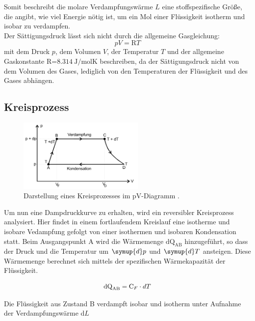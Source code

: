 Somit beschreibt die molare Verdampfungswärme $L$ eine stoffspezifische Größe, die angibt, wie viel Energie nötig ist,
um ein Mol einer Flüssigkeit isotherm und isobar zu verdampfen.\\
Der Sättigungsdruck lässt sich nicht durch die allgemeine Gasgleichung:
\begin{equation}
    pV=\text{R}T
    \label{eqn:Gasgl}
\end{equation}
mit dem Druck $p$, dem Volumen $V$, der Temperatur $T$ und der allgemeine Gaskonstante R=$\SI{8.314}{\joule\per\mole\kelvin}$ 
beschreiben, da der Sättigungsdruck nicht von dem Volumen des Gases, lediglich von den Temperaturen der Flüssigkeit 
und des Gases abhängen.
\\

\subsection{Kreisprozess}

\begin{figure}[H]
    \centering
    \includegraphics[width=0.55\textwidth]{images/Kreislauf.PNG}
    \caption{Darstellung eines Kreisprozesses im pV-Diagramm \protect \cite{V203}.}
    \label{img:Kreislauf}
\end{figure}

\noindent Um nun eine Dampdruckkurve zu erhalten, wird ein reversibler Kreisprozess analysiert. Hier findet in einem fortlaufendem 
Kreislauf eine isotherme und isobare Vedampfung gefolgt von einer isothermen und isobaren Kondensation statt.
Beim Ausgangspunkt A wird die Wärmemenge $\text{dQ}_\text{AB} $ hinzugeführt, so dass der Druck und die Temperatur um $\symup{d}p$ und $\symup{d}T$ ansteigen.
Diese Wärmemenge berechnet sich mittels der spezifischen Wärmekapazität der Flüssigkeit.

\begin{equation}
    \text{dQ}_\text{AB}= \text{C}_F \cdot dT \nonumber\\
\end{equation}
\newpage

\noindent Die Flüssigkeit aus Zustand B verdampft isobar und isotherm unter Aufnahme der Verdampfungswärme d$L$\\

